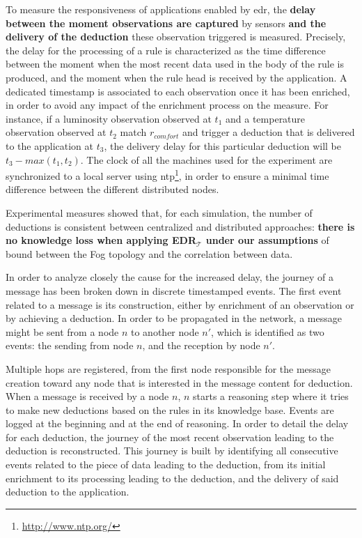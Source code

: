 \documentclass{iosart2c}
\newcommand{\edrt}{EDR$_{\mathcal{T}}$\xspace}
\begin{document}
To measure the responsiveness of applications enabled by \gls{edr}, the \textbf{delay between the moment observations are captured} by sensors \textbf{and the delivery of the deduction} these observation triggered is measured.
Precisely, the delay for the processing of a rule is characterized as the time difference between the moment when the most recent data used in the body of the rule is produced, and the moment when the rule head is received by the application.
A dedicated timestamp is associated to each observation once it has been enriched, in order to avoid any impact of the enrichment process on the measure.
For instance, if a luminosity observation observed at $t_{1}$ and a temperature observation observed at $t_{2}$ match $r_{comfort}$ and trigger a deduction that is delivered to the application at $t_{3}$, the delivery delay for this particular deduction will be $t_3 - max(t_1, t_2)$.
The clock of all the machines used for the experiment are synchronized to a local server using \gls{ntp}\footnote{\url{http://www.ntp.org/}}, in order to ensure a minimal time difference between the different distributed nodes.

Experimental measures showed that, for each simulation, the number of deductions is consistent between centralized and distributed approaches: \textbf{there is no knowledge loss when applying \edrt under our assumptions} of bound between the Fog topology and the correlation between data.

In order to analyze closely the cause for the increased delay, the journey of a message has been broken down in discrete timestamped events. 
The first event related to a message is its construction, either by enrichment of an observation or by achieving a deduction.
In order to be propagated in the network, a message might be sent from a node $n$ to another node $n'$, which is identified as two events: the sending from node $n$, and the reception by node $n'$.

Multiple hops are registered, from the first node responsible for the message creation toward any node that is interested in the message content for deduction.
When a message is received by a node $n$, $n$ starts a reasoning step where it tries to make new deductions based on the rules in its knowledge base. 
Events are logged at the beginning and at the end of reasoning.
In order to detail the delay for each deduction, the journey of the most recent observation leading to the deduction is reconstructed.
This journey is built by identifying all consecutive events related to the piece of data leading to the deduction, from its initial enrichment to its processing leading to the deduction, and the delivery of said deduction to the application.
\end{document}
